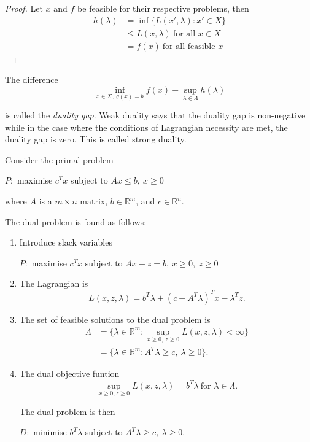 \documentclass[a4paper]{article}
\begin{document}
\begin{proof}
  Let $x$ and $f$ be feasible for their respective problems, then
  \begin{align*}
    h(\lambda) &= \inf\{L(x', \lambda): x' \in X \} \\
               &\leq L(x, \lambda) \: \text{for all } x \in X \\
               &= f(x) \: \text{for all feasible } x
  \end{align*}
\end{proof}

The difference
\[
  \inf_{x \in X,\: g(x) = b} f(x) - \sup_{\lambda \in \Lambda} h(\lambda)
\]

is called the \emph{duality gap}. Weak duality says that the duality gap is non-negative while in the case where the conditions of Lagrangian necessity are met, the duality gap is zero. This is called strong duality.

\begin{eg}
  Consider the primal problem
  \begin{center}
    $P:$ maximise $c^T x$ subject to $Ax \leq b,\: x \geq 0$
  \end{center}
  where $A$ is a $m \times n$ matrix, $b \in \mathbb{R}^m$, and $c \in \mathbb{R}^n$.

  The dual problem is found as follows:
  \begin{enumerate}
  \item Introduce slack variables
    \begin{center}
      $P:$ maximise $c^T x$ subject to $Ax + z = b, \: x \geq 0, \: z \geq 0$
    \end{center}
  \item The Lagrangian is
    \[
      L(x, z, \lambda) = b^T \lambda + (c - A^T \lambda)^T x - \lambda ^T z.
    \]
  \item The set of feasible solutions to the dual problem is
    \begin{align*}
      \Lambda &= \{\lambda \in \mathbb{R}^m: \sup_{x \geq 0,\: z \geq 0} L(x, z, \lambda) < \infty \} \\
              &= \{\lambda \in \mathbb{R}^m: A^T \lambda \geq c,\: \lambda \geq 0\}.
    \end{align*}
  \item The dual objective funtion
    \[
      \sup_{x \geq 0, z \geq 0} L(x, z, \lambda) = b^T \lambda \: \text{for } \lambda \in \Lambda.
    \]

    The dual problem is then

    \begin{center}
      $D:$ minimise $b^T \lambda$ subject to $A^T \lambda \geq c,\: \lambda \geq 0$.
    \end{center}
  \end{enumerate}
\end{eg}
\end{document}

